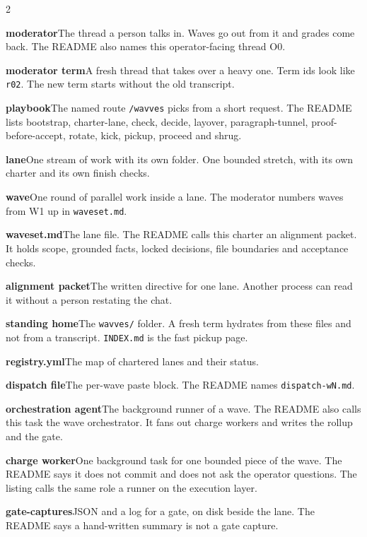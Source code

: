 \documentclass[10pt]{article}
\begin{document}
\begin{multicols}{2}
\raggedright
{}
\setlength{\parindent}{0pt}
\setlength{\parskip}{0.55em}
\noindent\textbf{moderator}\quad The thread a person talks in. Waves go out from it and grades come back. The README also names this operator-facing thread O0.

\textbf{moderator term}\quad A fresh thread that takes over a heavy one. Term ids look like \texttt{r02}. The new term starts without the old transcript.

\textbf{playbook}\quad The named route \texttt{/wavves} picks from a short request. The README lists bootstrap, charter-lane, check, decide, layover, paragraph-tunnel, proof-before-accept, rotate, kick, pickup, proceed and shrug.

\textbf{lane}\quad One stream of work with its own folder. One bounded stretch, with its own charter and its own finish checks.

\textbf{wave}\quad One round of parallel work inside a lane. The moderator numbers waves from W1 up in \texttt{waveset.md}.

\textbf{waveset.md}\quad The lane file. The README calls this charter an alignment packet. It holds scope, grounded facts, locked decisions, file boundaries and acceptance checks.

\textbf{alignment packet}\quad The written directive for one lane. Another process can read it without a person restating the chat.

\textbf{standing home}\quad The \texttt{wavves/} folder. A fresh term hydrates from these files and not from a transcript. \texttt{INDEX.md} is the fast pickup page.

\textbf{registry.yml}\quad The map of chartered lanes and their status.

\textbf{dispatch file}\quad The per-wave paste block. The README names \texttt{dispatch-wN.md}.

\textbf{orchestration agent}\quad The background runner of a wave. The README also calls this task the wave orchestrator. It fans out charge workers and writes the rollup and the gate.

\textbf{charge worker}\quad One background task for one bounded piece of the wave. The README says it does not commit and does not ask the operator questions. The listing calls the same role a runner on the execution layer.

\textbf{gate-captures}\quad JSON and a log for a gate, on disk beside the lane. The README says a hand-written summary is not a gate capture.


\end{multicols}
\end{document}
